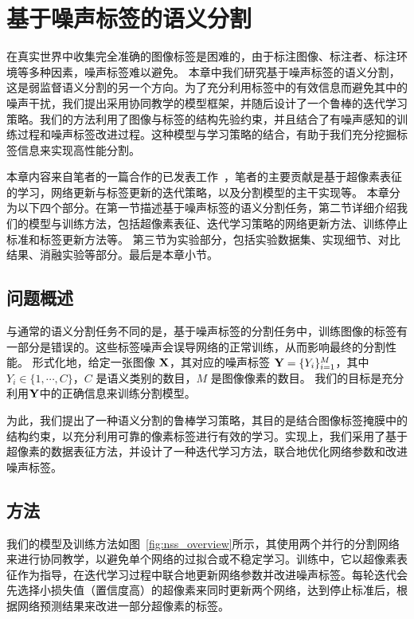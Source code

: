 \chapter{基于噪声标签的语义分割}

在真实世界中收集完全准确的图像标签是困难的，由于标注图像、标注者、标注环境等多种因素，噪声标签难以避免。
本章中我们研究基于噪声标签的语义分割，这是弱监督语义分割的另一个方向。为了充分利用标签中的有效信息而避免其中的噪声干扰，我们提出采用协同教学的模型框架，并随后设计了一个鲁棒的迭代学习策略。我们的方法利用了图像与标签的结构先验约束，并且结合了有噪声感知的训练过程和噪声标签改进过程。这种模型与学习策略的结合，有助于我们充分挖掘标签信息来实现高性能分割。

本章内容来自笔者的一篇合作的已发表工作~\citep{li2021superpixel}，笔者的主要贡献是基于超像素表征的学习，网络更新与标签更新的迭代策略，以及分割模型的主干实现等。
本章分为以下四个部分。在第一节描述基于噪声标签的语义分割任务，第二节详细介绍我们的模型与训练方法，包括超像素表征、迭代学习策略的网络更新方法、训练停止标准和标签更新方法等。
第三节为实验部分，包括实验数据集、实现细节、对比结果、消融实验等部分。最后是本章小节。

\section{问题概述}
与通常的语义分割任务不同的是，基于噪声标签的分割任务中，训练图像的标签有一部分是错误的。这些标签噪声会误导网络的正常训练，从而影响最终的分割性能。
形式化地，给定一张图像 $\mathbf{X}$，其对应的噪声标签 $\mathbf{Y}=\{Y_i\}_{i=1}^M$，其中 $Y_i\in\{1,\cdots, C\}$，$C$ 是语义类别的数目，$M$ 是图像像素的数目。
我们的目标是充分利用$\mathbf{Y}$中的正确信息来训练分割模型。

为此，我们提出了一种语义分割的鲁棒学习策略，其目的是结合图像标签掩膜中的结构约束，以充分利用可靠的像素标签进行有效的学习。实现上，我们采用了基于超像素的数据表征方法，并设计了一种迭代学习方法，联合地优化网络参数和改进噪声标签。

\section{方法}
我们的模型及训练方法如图~\ref{fig:nss_overview}所示，其使用两个并行的分割网络来进行协同教学，以避免单个网络的过拟合或不稳定学习。训练中，它以超像素表征作为指导，在迭代学习过程中联合地更新网络参数并改进噪声标签。每轮迭代会先选择小损失值（置信度高）的超像素来同时更新两个网络，达到停止标准后，根据网络预测结果来改进一部分超像素的标签。

